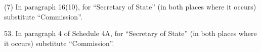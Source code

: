 \documentclass[12pt,a4paper]{article}
\begin{document}
(7) In paragraph 16(10), for “Secretary of State” (in both places where it occurs) substitute “Commission”.

\medskip

53. In paragraph 4 of Schedule 4A, for “Secretary of State” (in both places where it occurs) substitute “Commission”.


%

%
%
%
%
%
%
%
%
\end{document}
